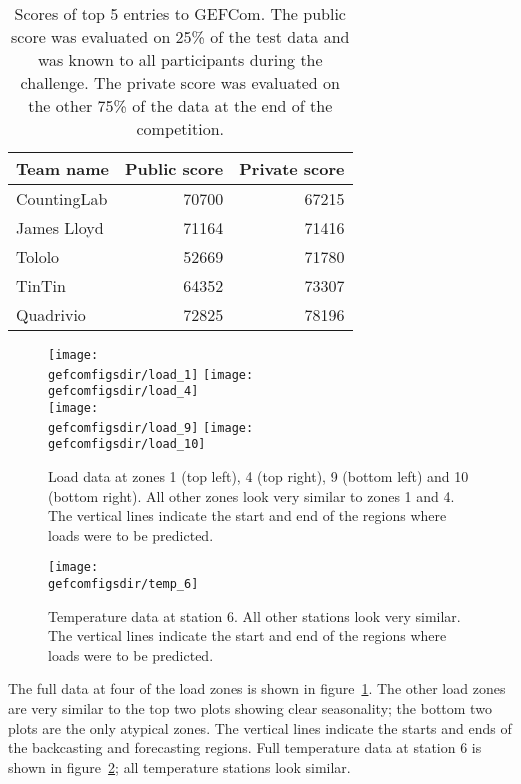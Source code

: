\begin{table}[ht]
  \begin{center}
    \begin{tabular}{l|r|r}
      Team name & Public score & Private score \\
      \hline
      CountingLab & 70700 & 67215 \\
      James Lloyd & 71164 & 71416 \\
      Tololo & 52669 & 71780 \\
      TinTin & 64352 & 73307 \\
      Quadrivio & 72825 & 78196
    \end{tabular}
  \end{center}
  \caption[Scores of top 5 entries to GEFCom]{
    Scores of top 5 entries to GEFCom.
    The public score was evaluated on 25\% of the test data and was known to all participants during the challenge.
    The private score was evaluated on the other 75\% of the data at the end of the competition.}
  \label{table:gefcom:scores}
\end{table}

\begin{figure}[ht]
\centering
\texttt{[image: \\gefcomfigsdir/load\_1]}
\texttt{[image: \\gefcomfigsdir/load\_4]} \\
\texttt{[image: \\gefcomfigsdir/load\_9]}
\texttt{[image: \\gefcomfigsdir/load\_10]}
\caption[Example load data from GEFCom.]{
Load data at zones 1 (top left), 4 (top right), 9 (bottom left) and 10 (bottom right).
All other zones look very similar to zones 1 and 4.
The vertical lines indicate the start and end of the regions where loads were to be predicted.
}
\label{fig:gefcom:exampleload}
\end{figure}

\begin{figure}[ht]
\centering
\texttt{[image: \\gefcomfigsdir/temp\_6]}
\caption[Example temperature data from GEFCom.]{
Temperature data at station 6.
All other stations look very similar.
The vertical lines indicate the start and end of the regions where loads were to be predicted.
}
\label{fig:gefcom:exampletemp}
\end{figure}

The full data at four of the load zones is shown in figure~\ref{fig:gefcom:exampleload}.
The other load zones are very similar to the top two plots showing clear seasonality; the bottom two plots are the only atypical zones.
The vertical lines indicate the starts and ends of the backcasting and forecasting regions.
Full temperature data at station 6 is shown in figure~\ref{fig:gefcom:exampletemp}; all temperature stations look similar.


